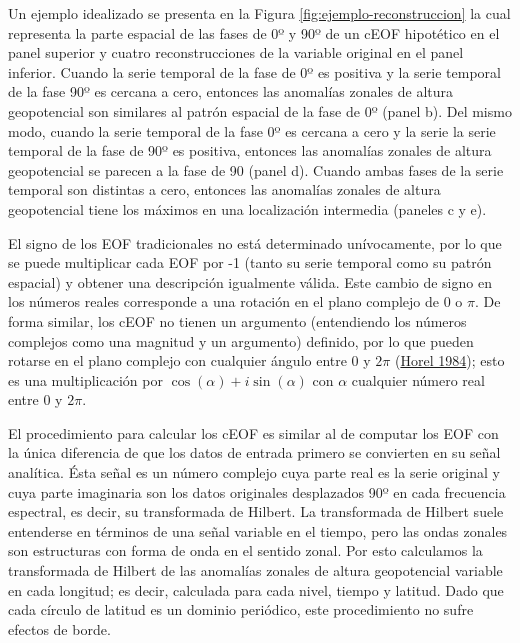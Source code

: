 \documentclass[12pt,oneside,a4paper]{reedthesis}
\begin{document}
Un ejemplo idealizado se presenta en la Figura \ref{fig:ejemplo-reconstruccion} la cual representa la parte espacial de las fases de 0º y 90º de un cEOF hipotético en el panel superior y cuatro reconstrucciones de la variable original en el panel inferior.
Cuando la serie temporal de la fase de 0º es positiva y la serie temporal de la fase 90º es cercana a cero, entonces las anomalías zonales de altura geopotencial son similares al patrón espacial de la fase de 0º (panel b).
Del mismo modo, cuando la serie temporal de la fase 0º es cercana a cero y la serie la serie temporal de la fase de 90º es positiva, entonces las anomalías zonales de altura geopotencial se parecen a la fase de 90 (panel d).
Cuando ambas fases de la serie temporal son distintas a cero, entonces las anomalías zonales de altura geopotencial tiene los máximos en una localización intermedia (paneles c y e).

El signo de los EOF tradicionales no está determinado unívocamente, por lo que se puede multiplicar cada EOF por -1 (tanto su serie temporal como su patrón espacial) y obtener una descripción igualmente válida.
Este cambio de signo en los números reales corresponde a una rotación en el plano complejo de 0 o \(\pi\).
De forma similar, los cEOF no tienen un argumento (entendiendo los números complejos como una magnitud y un argumento) definido, por lo que pueden rotarse en el plano complejo con cualquier ángulo entre 0 y \(2\pi\) (\protect\hyperlink{ref-horel1984}{Horel 1984}); esto es una multiplicación por \(\cos(\alpha) + i\sin(\alpha)\) con \(\alpha\) cualquier número real entre 0 y \(2\pi\).

El procedimiento para calcular los cEOF es similar al de computar los EOF con la única diferencia de que los datos de entrada primero se convierten en su señal analítica.
Ésta señal es un número complejo cuya parte real es la serie original y cuya parte imaginaria son los datos originales desplazados 90º en cada frecuencia espectral, es decir, su transformada de Hilbert.
La transformada de Hilbert suele entenderse en términos de una señal variable en el tiempo, pero las ondas zonales son estructuras con forma de onda en el sentido zonal.
Por esto calculamos la transformada de Hilbert de las anomalías zonales de altura geopotencial variable en cada longitud; es decir, calculada para cada nivel, tiempo y latitud.
Dado que cada círculo de latitud es un dominio periódico, este procedimiento no sufre efectos de borde.
\end{document}

